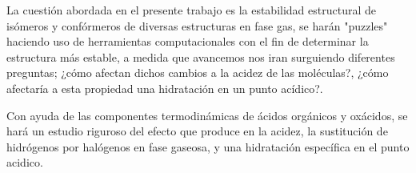 La cuestión abordada en el presente trabajo es la estabilidad estructural de isómeros y confórmeros de diversas estructuras en fase gas, se harán "puzzles" haciendo uso de herramientas computacionales  con el fin de determinar la estructura más estable, a medida que avancemos nos iran surguiendo diferentes preguntas; ¿cómo afectan dichos cambios a la acidez de las moléculas?, ¿cómo afectaría a esta propiedad una hidratación en un punto acídico?.

Con ayuda de las componentes termodinámicas de ácidos orgánicos y oxácidos, se hará un estudio riguroso del efecto que produce en la acidez, la sustitución de hidrógenos por halógenos en fase gaseosa, y una hidratación específica en el punto acidico. \cite{quimica3} 

